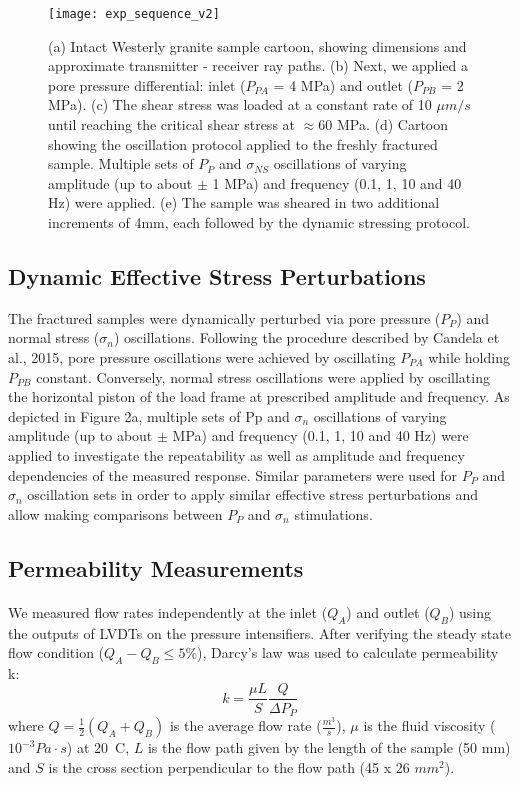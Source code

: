 \newpage


\begin{figure*}[ht]
	\centering
	\texttt{[image: exp\_sequence\_v2]}
	\caption[]{(a) Intact Westerly granite sample cartoon, showing dimensions and approximate transmitter - receiver ray paths. 
		(b) Next, we applied a pore pressure differential: inlet ($P_{PA}$ = 4 MPa) and outlet ($P_{PB}$ = 2 MPa). 
		(c) The shear stress was loaded at a constant rate of 10 $\mu m/s$ until reaching the critical shear stress at $ \approx $60 MPa. 
		(d) Cartoon showing the oscillation protocol applied to the freshly fractured sample. Multiple sets of $P_{P}$ and $ \sigma_{NS} $ oscillations of varying amplitude (up to about $ \pm $ 1 MPa) and frequency (0.1, 1, 10 and 40 Hz) were applied. 
		(e) The sample was sheared in two additional increments of 4mm, each followed by the dynamic stressing protocol.}
	\label{fig:exp_seq}
\end{figure*}


\newpage

\subsection{Dynamic Effective Stress Perturbations}
The fractured samples were dynamically perturbed via pore pressure ($P_P$) and normal stress ($\sigma_{n}$) oscillations. Following the procedure described by Candela et al., 2015, pore pressure oscillations were achieved by oscillating $P_{PA}$ while holding $P_{PB}$ constant. Conversely, normal stress oscillations were
applied by oscillating the horizontal piston of the load frame at prescribed amplitude and frequency. 
As depicted in Figure 2a, multiple sets of Pp and $\sigma_n$ oscillations of varying amplitude (up to about $\pm$ MPa) and frequency (0.1, 1, 10 and 40 Hz) were applied to investigate the repeatability as well as amplitude and frequency dependencies of the measured response. Similar parameters were used for $P_P$ and $\sigma_{n}$ oscillation sets in order to apply similar effective stress perturbations and allow making comparisons between $P_P$ and $\sigma_{n}$ stimulations.


\subsection{Permeability Measurements}
\paragraph{} We measured flow rates independently at the inlet ($Q_A$) and outlet ($Q_B$) using the outputs of LVDTs on the pressure intensifiers. After verifying the steady state flow condition ($Q_{A} - Q_{B}  \leq 5 \% $), Darcy’s law was
used to calculate permeability k: 
\begin{equation} \label{eq:perm}
k = \frac{\mu L}{S} \frac{Q}{\Delta P_P}
\end{equation}
where $Q = \frac{1}{2} (Q_A + Q_B )$ is the average flow rate ($\frac{m^3}{s}$), $\mu$ is the fluid viscosity ($10^{-3} Pa\cdot s$) at 20\textdegree\ C, $L$ is the flow path given by the length of the sample (50 mm) and $S$ is the cross section perpendicular to the flow path (45 x 26 $mm^2$).
